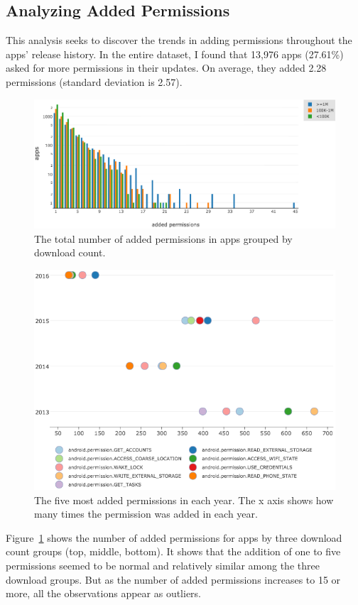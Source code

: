\subsection{Analyzing Added Permissions}
This analysis seeks to discover the trends in adding permissions throughout the apps' release history.
In the entire dataset, I found that 13,976 apps (27.61\%) asked for more permissions in their updates.
On average, they added 2.28 permissions (standard deviation is 2.57).
\begin{figure}[H]
	\includegraphics[scale=0.50]{figures/findings/added_permissions_downloads.png}
	\caption{The total number of added permissions in apps grouped by download count.}
	\label{fig:added_permissions_downloads}
\end{figure}
\begin{figure}[H]
	\includegraphics[scale=0.60]{figures/findings/added_permissions_over_time.png}
	\caption{The five most added permissions in each year. The x axis shows how many times the permission was added in each year.}
	\label{fig:added_permissions_over_time}
\end{figure}
Figure~\ref{fig:added_permissions_downloads} shows the number of added permissions for apps by three download count groups (top, middle, bottom).
It shows that the addition of one to five permissions seemed to be normal and relatively similar among the three download groups.
But as the number of added permissions increases to 15 or more, all the observations appear as outliers.

